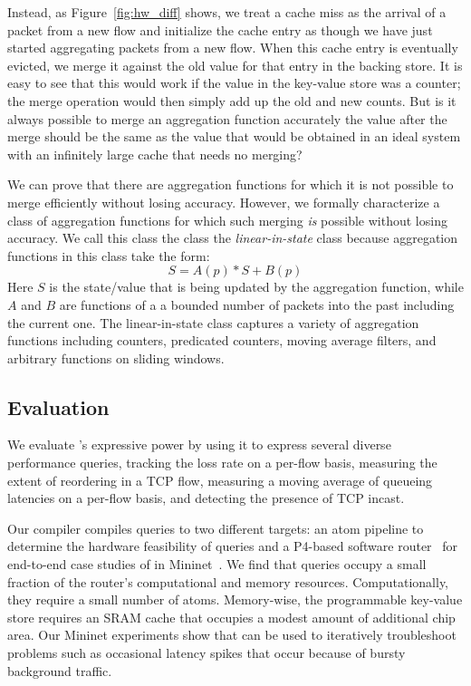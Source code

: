 Instead, as Figure~\ref{fig:hw_diff} shows, we treat a cache miss as the
arrival of a packet from a new flow and initialize the cache entry as though we
have just started aggregating packets from a new flow. When this cache entry is
eventually evicted, we merge it against the old value for that entry in the
backing store. It is easy to see that this would work if the value in the
key-value store was a counter; the merge operation would then simply add up the
old and new counts.  But is it always possible to merge an aggregation function
accurately \ie the value after the merge should be the same as the value that
would be obtained in an ideal system with an infinitely large cache that needs
no merging?

We can prove that there are aggregation functions for which it is not possible
to merge efficiently without losing accuracy. However, we formally characterize
a class of aggregation functions for which such merging {\em is} possible
without losing accuracy. We call this class the class the {\em linear-in-state}
class because aggregation functions in this class take the form:
\begin{equation}
S = A(p) * S + B(p)
\end{equation}
Here $S$ is the state/value that is being updated by the aggregation function,
while $A$ and $B$ are functions of a a bounded number of packets into the past
including the current one. The linear-in-state class captures a variety of
aggregation functions including counters, predicated counters, moving average
filters, and arbitrary functions on sliding windows.

\subsection{Evaluation} We evaluate \TheSystem's expressive power by using it
to express several diverse performance queries, \eg tracking the loss rate on a
per-flow basis, measuring the extent of reordering in a TCP flow, measuring a
moving average of queueing latencies on a per-flow basis, and detecting the
presence of TCP incast.

Our \TheSystem compiler compiles queries to two different targets: an atom
pipeline to determine the hardware feasibility of \TheSystem queries and a
P4-based software router~\cite{p4-bmv2} for end-to-end case studies of
\TheSystem in Mininet~\cite{mininet}. We find that \TheSystem queries occupy a
small fraction of the router's computational and memory resources.
Computationally, they require a small number of atoms. Memory-wise, the
programmable key-value store requires an SRAM cache that occupies a modest
amount of additional chip area. Our Mininet experiments show that \TheSystem
can be used to iteratively troubleshoot problems such as occasional latency
spikes that occur because of bursty background traffic.

